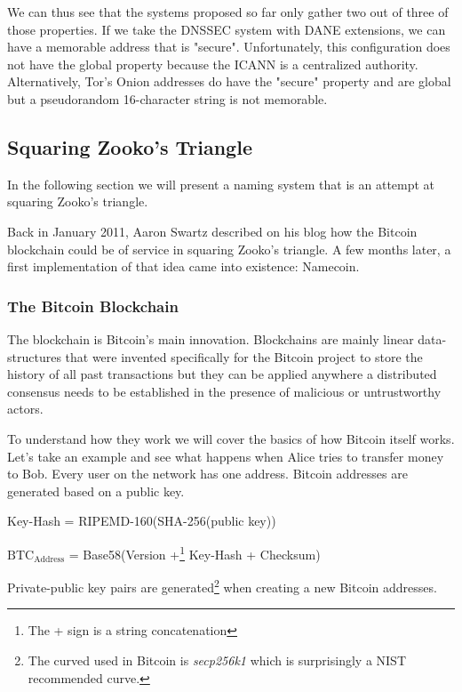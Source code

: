 \documentclass{vldb}
\begin{document}
We can thus see that the systems proposed so far only gather two out of three of those properties. If we take the DNSSEC system with DANE extensions, we can have a memorable address that is "secure". Unfortunately, this configuration does not have the global property because the ICANN is a centralized authority. Alternatively, Tor's Onion addresses do have the "secure" property and are global but a pseudorandom 16-character string is not memorable.

\subsection{Squaring Zooko's Triangle}

In the following section we will present a naming system that is an attempt at squaring Zooko's triangle.

Back in January 2011, Aaron Swartz described on his blog\cite{aaronBlog} how the Bitcoin blockchain could be of service in squaring Zooko's triangle. A few months later, a first implementation of that idea came into existence: Namecoin.

\subsubsection{The Bitcoin Blockchain}

The blockchain is Bitcoin's main innovation. Blockchains are mainly linear data-structures that were invented specifically for the Bitcoin project to store the history of all past transactions but they can be applied anywhere a distributed consensus needs to be established in the presence of malicious or untrustworthy actors.

To understand how they work we will cover the basics of how Bitcoin itself works. Let's take an example and see what happens when Alice tries to transfer money to Bob. Every user on the network has one address. Bitcoin addresses\cite{bitcoinSpec} are generated based on a public key. 
\begin{center}

Key-Hash = RIPEMD-160(SHA-256(public key))

$\text{BTC}_{\text{Address}}$ = Base58(Version +\footnote{The + sign is a string concatenation} Key-Hash + Checksum)
\end{center}

Private-public key pairs are generated\footnote{The curved used in Bitcoin is \emph{secp256k1} which is surprisingly a NIST recommended curve.} when creating a new Bitcoin addresses.
\end{document}
